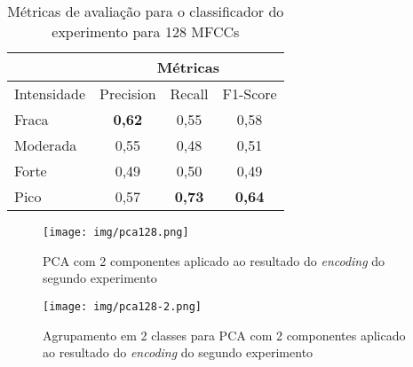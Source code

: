 \begin{table}%
    \centering
    \begin{tabular}{l|ccc|}
        \cline{2-4}
                                          & \multicolumn{3}{c|}{Métricas}                                                               \\ \hline
        \multicolumn{1}{|l|}{Intensidade} & \multicolumn{1}{c|}{Precision}      & \multicolumn{1}{c|}{Recall}           & F1-Score      \\ \hline
        \multicolumn{1}{|l|}{Fraca}       & \multicolumn{1}{c|}{\textbf{0,62}}  & \multicolumn{1}{c|}{0,55}             & 0,58          \\ \hline
        \multicolumn{1}{|l|}{Moderada}    & \multicolumn{1}{c|}{0,55}           & \multicolumn{1}{c|}{0,48}             & 0,51          \\ \hline
        \multicolumn{1}{|l|}{Forte}       & \multicolumn{1}{c|}{0,49}           & \multicolumn{1}{c|}{0,50}              & 0,49          \\ \hline
        \multicolumn{1}{|l|}{Pico}        & \multicolumn{1}{c|}{0,57}           & \multicolumn{1}{c|}{\textbf{0,73}}    & \textbf{0,64} \\ \hline
    \end{tabular}
        \caption{\label{table:metricasclf128}Métricas de avaliação para o classificador do experimento para 128 \acrshort{MFCC}s}
\end{table}

\begin{figure}%
    \centering
    \texttt{[image: img/pca128.png]}
    \caption{\label{fig:pca128}\acrshort{PCA} com 2 componentes aplicado ao resultado do \textit{encoding} do segundo experimento}
\end{figure}

\begin{figure}%
    \centering
    \texttt{[image: img/pca128-2.png]}
    \caption{\label{fig:pca128-2}Agrupamento em 2 classes para \acrshort{PCA} com 2 componentes aplicado ao resultado do \textit{encoding} do segundo experimento}
\end{figure}
